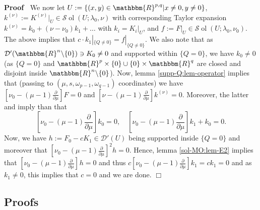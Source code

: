 \documentclass{article}
\newcommand{\assign}{:=}
\newcommand{\tmop}[1]{\ensuremath{\operatorname{#1}}}
\newenvironment{proof}{\noindent\textbf{Proof\ }}{\hspace*{\fill}$\Box$\medskip}
\numberwithin{definition}{section}
\numberwithin{lemma}{section}
\numberwithin{proposition}{section}
{\theorembodyfont{\rmfamily}\newtheorem{remark}{Remark}
\numberwithin{remark}{section}
}
\begin{document}
\begin{proof}
  We now let $U \assign \{ ( x, y) \in \mathbbm{R}^{p, q} | x \neq 0, y \neq 0
  \}$, $k^{( \nu)} \assign K^{( \nu)} |_U \in \mathcal{S} \tmop{ol} ( U ;
  \lambda_0, \nu)$ with corresponding Taylor expansion $k^{( \nu)} = k_0 + (
  \nu - \nu_0) k_1 + \ldots$ with $k_i = K_i |_U$, and $f \assign F |_U \in
  \mathcal{S} \tmop{ol} ( U ; \lambda_0, \nu_0)$. The above implies that $c
  \cdot k_1 |_{\{ Q \neq 0 \}} = f |_{\{ Q \neq 0 \}}$. We also note that as
  $\mathcal{D}' ( \mathbbm{R}^n \backslash \{ 0 \}) \ni K_0 \neq 0$ and
  supported within $\{ Q = 0 \}$, we have $k_0 \neq 0$ (as $\{ Q = 0 \}$ and
  $\mathbbm{R}^p \times \{ 0 \} \cup \{ 0 \} \times \mathbbm{R}^q$ are closed
  and disjoint inside $\mathbbm{R}^n \backslash \{ 0 \}$). Now, lemma
  \ref{supp-Q:lem-operator} implies that (passing to $( \mu, s, \omega_{p -
  1}, \omega_{q - 1})$ coordinates) we have $\left[ \nu_0 - ( \mu - 1)
  \frac{\partial}{\partial \mu} \right] F = 0$ and $\left[ \nu - ( \mu - 1)
  \frac{\partial}{\partial \mu} \right] k^{( \nu)} = 0$. Moreover, the latter
  and {\cite[lem. 11.10]{kobayashi2015symmetry}} imply than that
  \[ \left[ \nu_0 - ( \mu - 1) \frac{\partial}{\partial \mu} \right] k_0 = 0,
     \hspace{1em} \left[ \nu_0 - ( \mu - 1) \frac{\partial}{\partial \mu}
     \right] k_1 + k_0 = 0. \]
  Now, we have $h \assign F_0 - c K_1 \in \mathcal{D}' ( U)$ being supported
  inside $\{ Q = 0 \}$ and moreover that $\left[ \nu_0 - ( \mu - 1)
  \frac{\partial}{\partial \mu} \right]^2 h = 0$. Hence, lemma
  \ref{sol-MO:lem-E2} implies that $\left[ \nu_0 - ( \mu - 1)
  \frac{\partial}{\partial \mu} \right]^{} h = 0$ and thus $c \left[ \nu_0 - (
  \mu - 1) \frac{\partial}{\partial \mu} \right] k_1 = c k_1 = 0$ and as $k_1
  \neq 0$, this implies that $c = 0$ and we are done.
\end{proof}

\subsection{Proofs}
\end{document}
